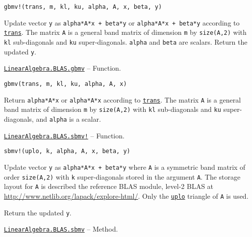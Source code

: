 \begin{adjustwidth}{2em}{0pt}


\begin{verbatim}
gbmv!(trans, m, kl, ku, alpha, A, x, beta, y)
\end{verbatim}

Update vector \texttt{y} as \texttt{alpha*A*x + beta*y} or \texttt{alpha*A{\textquotesingle}*x + beta*y} according to \hyperlink{15951037910221396131}{\texttt{trans}}. The matrix \texttt{A} is a general band matrix of dimension \texttt{m} by \texttt{size(A,2)} with \texttt{kl} sub-diagonals and \texttt{ku} super-diagonals. \texttt{alpha} and \texttt{beta} are scalars. Return the updated \texttt{y}.



\end{adjustwidth}
\hypertarget{12471388286549789624}{}
\hyperlink{12471388286549789624}{\texttt{LinearAlgebra.BLAS.gbmv}}  -- {Function.}

\begin{adjustwidth}{2em}{0pt}


\begin{verbatim}
gbmv(trans, m, kl, ku, alpha, A, x)
\end{verbatim}

Return \texttt{alpha*A*x} or \texttt{alpha*A{\textquotesingle}*x} according to \hyperlink{15951037910221396131}{\texttt{trans}}. The matrix \texttt{A} is a general band matrix of dimension \texttt{m} by \texttt{size(A,2)} with \texttt{kl} sub-diagonals and \texttt{ku} super-diagonals, and \texttt{alpha} is a scalar.



\end{adjustwidth}
\hypertarget{321677349067447286}{}
\hyperlink{321677349067447286}{\texttt{LinearAlgebra.BLAS.sbmv!}}  -- {Function.}

\begin{adjustwidth}{2em}{0pt}


\begin{verbatim}
sbmv!(uplo, k, alpha, A, x, beta, y)
\end{verbatim}

Update vector \texttt{y} as \texttt{alpha*A*x + beta*y} where \texttt{A} is a symmetric band matrix of order \texttt{size(A,2)} with \texttt{k} super-diagonals stored in the argument \texttt{A}. The storage layout for \texttt{A} is described the reference BLAS module, level-2 BLAS at \href{http://www.netlib.org/lapack/explore-html/}{http://www.netlib.org/lapack/explore-html/}. Only the \hyperlink{13880289478825450693}{\texttt{uplo}} triangle of \texttt{A} is used.

Return the updated \texttt{y}.



\end{adjustwidth}
\hypertarget{2623851333430117506}{}
\hyperlink{2623851333430117506}{\texttt{LinearAlgebra.BLAS.sbmv}}  -- {Method.}

